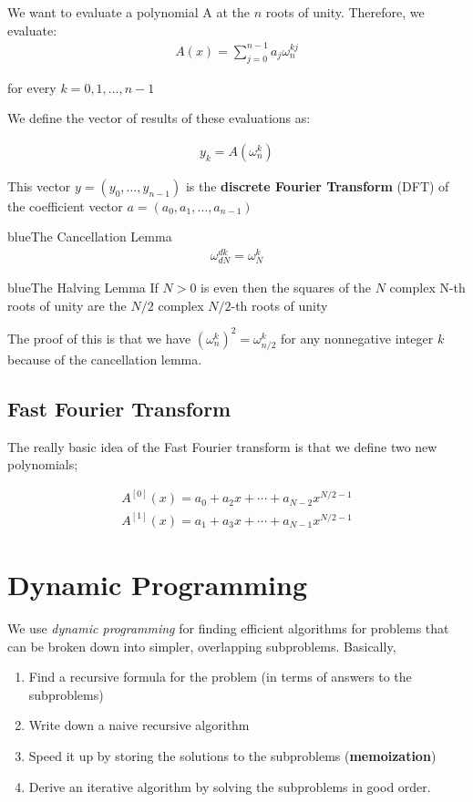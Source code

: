 \documentclass[11pt,a4paper,titlepage,dvipsnames,cmyk]{scrartcl}
\begin{document}
We want to evaluate a polynomial A at the $n$ roots of unity. Therefore,
we evaluate:
\begin{align*}
    A(x) = \sum_{j=0}^{n-1}a_j \omega_n^{kj}
\end{align*}

for every $k = 0,1,\dots, n-1$

We define the vector of results of these evaluations as:

\begin{align*}
    y_k = A(\omega^k_n)
\end{align*}

This vector $y = (y_0, \dots, y_{n-1})$ is the \textbf{discrete Fourier
Transform} (DFT) of the coefficient vector $a = (a_0, a_1, \dots, a_{n-1})$

\begin{titlebox}{blue}{The Cancellation Lemma}
\begin{align*}
    \omega^{dk}_{dN} = \omega^{k}_{N}
\end{align*}
\end{titlebox}

\begin{titlebox}{blue}{The Halving Lemma}
    If $N > 0$ is even then the squares of the $N$ complex N-th roots of
    unity are the $N/2$ complex $N/2$-th roots of unity

    The proof of this is that we have $(\omega^k_n) ^2 = \omega^k_{n/2}$
    for any nonnegative integer $k$ because of the cancellation lemma.
\end{titlebox}

\subsection{Fast Fourier Transform}%
\label{sub:fft}
The really basic idea of the Fast Fourier transform is that we define two
new polynomials;

\begin{align*}
    A^{[0]}(x) = a_0 + a_2x + \cdots + a_{N-2}x^{N/2 - 1} \\
    A^{[1]}(x) = a_1 + a_3x + \cdots + a_{N-1}x^{N/2 - 1}
\end{align*}

\section{Dynamic Programming}%
\label{sec:dynamic-programming}
We use \textit{dynamic programming} for finding efficient algorithms for
problems that can be broken down into simpler, overlapping subproblems.
Basically,
\begin{enumerate}
    \item Find a recursive formula for the problem (in terms of answers to
        the subproblems)
    \item Write down a naive recursive algorithm
    \item Speed it up by storing the solutions to the subproblems (\textbf{memoization})
    \item Derive an iterative algorithm by solving the subproblems in good
        order.
\end{enumerate}
\end{document}
